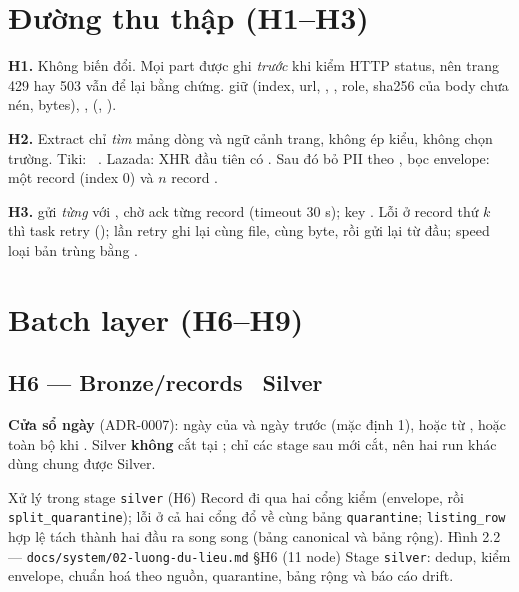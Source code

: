 \section{Đường thu thập (H1--H3)}
\textbf{H1.} Không biến đổi. Mọi part được ghi \emph{trước} khi kiểm HTTP status, nên trang 429 hay 503 vẫn để lại bằng chứng.
 giữ  (index, url, , , role, sha256 của body chưa nén, bytes),
,  (, ).

\textbf{H2.} Extract chỉ \emph{tìm} mảng dòng và ngữ cảnh trang, không ép kiểu, không chọn trường.
Tiki:  \ra\ . Lazada: XHR đầu tiên có .
Sau đó bỏ PII theo , bọc envelope: một record  (index 0) và $n$ record .

\textbf{H3.}  gửi \emph{từng}  với , chờ ack từng record (timeout 30 s); key
. Lỗi ở record thứ $k$ thì task retry (); lần retry ghi lại cùng file, cùng byte, rồi gửi
lại từ đầu; speed loại bản trùng bằng .

\section{Batch layer (H6--H9)}\label{sec:batch}
\subsection{H6 — Bronze/records \ra\ Silver}
\textbf{Cửa sổ ngày} (ADR-0007): ngày của  và  ngày trước (mặc định 1), hoặc từ ,
hoặc toàn bộ khi . Silver \textbf{không} cắt tại ; chỉ các stage sau mới cắt, nên hai run khác 
dùng chung được Silver.

  {Xử lý trong stage \texttt{silver} (H6)}
  {Record đi qua hai cổng kiểm (envelope, rồi \texttt{split\_quarantine}); lỗi ở cả hai cổng đổ về cùng bảng \texttt{quarantine}; \texttt{listing\_row} hợp lệ tách thành hai đầu ra song song (bảng canonical và bảng rộng).}
  {Hình 2.2 — \texttt{docs/system/02-luong-du-lieu.md} §H6 (11 node)}
  {Stage \texttt{silver}: dedup, kiểm envelope, chuẩn hoá theo nguồn, quarantine, bảng rộng và báo cáo drift.}

